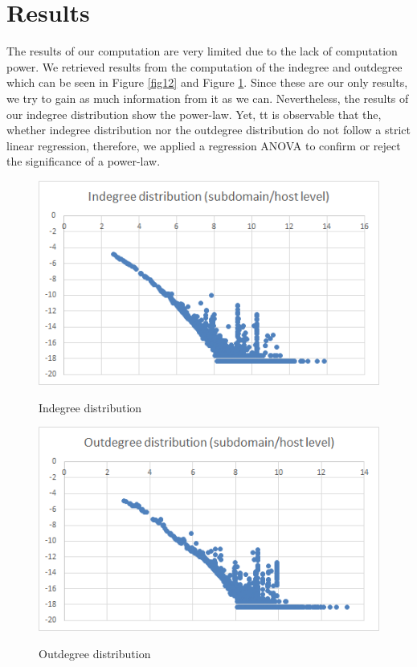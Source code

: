 \section{Results}
The results of our computation are very limited due to the lack of computation power. We retrieved results from the computation of the indegree and outdegree which can be seen in Figure \ref{fig12} and Figure \ref{fig13}. Since these are our only results, we try to gain as much information from it as we can. Nevertheless, the results of our indegree distribution show the power-law. Yet, tt is observable that the, whether indegree distribution nor the outdegree distribution do not follow a strict linear regression, therefore, we applied  a regression ANOVA to confirm or reject the significance of a power-law.

\begin{figure}[H]
\begin{minipage}{.5\textwidth}
	\begin{center}
		\label{fig12}		
		\includegraphics[width=1.0\textwidth]{fig12}	
		\caption{Indegree distribution}	
	\end{center}
\end{minipage} %
\begin{minipage}{.5\textwidth}
	\begin{center}
		\label{fig13}		
		\includegraphics[width=1.0\textwidth]{fig13}	
		\caption{Outdegree distribution}	
	\end{center}
\end{minipage}
\end{figure}

